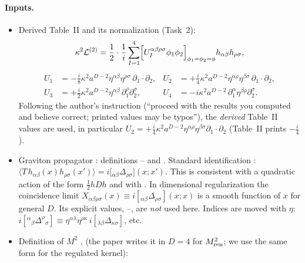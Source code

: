 \paragraph{Inputs.}
\begin{itemize}[leftmargin=2.6em]
\item[(G1)] Derived Table~II and its normalization \tD{} (Task~2):
\begin{equation}\label{eq:t3-G1}
\kappa^2\mathcal L^{(2)}=\frac12\cdot\frac1i\sum_{I=1}^4\Bigl[U_I^{\alpha\beta\rho\sigma}\phi_1\phi_2\Bigr]_{\phi_1=\phi_2=\phi}h_{\alpha\beta}h_{\rho\sigma},
\end{equation}
\begin{equation}\label{eq:t3-U}
\begin{aligned}
U_1&=-\tfrac i8\kappa^2a^{D-2}\eta^{\alpha\beta}\eta^{\rho\sigma}\,\partial_1\!\cdot\partial_2, &
U_2&=+\tfrac i4\kappa^2a^{D-2}\eta^{\alpha\rho}\eta^{\beta\sigma}\,\partial_1\!\cdot\partial_2,\\
U_3&=+\tfrac i2\kappa^2a^{D-2}\eta^{\alpha\beta}\,\partial_1^\rho\partial_2^\sigma, &
U_4&=-i\kappa^2a^{D-2}\,\partial_1^\alpha\eta^{\beta\rho}\partial_2^\sigma .
\end{aligned}
\end{equation}
Following the author's instruction (``proceed with the results you computed and believe
correct; printed values may be typos''), the \emph{derived} Table~II values are used,
in particular \(U_2=+\tfrac i4\kappa^2a^{D-2}\eta^{\alpha\rho}\eta^{\beta\sigma}\partial_1\!\cdot\partial_2\)
(Table~II prints \(-\tfrac i4\)).
\item[(G2)] Graviton propagator \tP: definitions -- and .
Standard identification \tA:
\(\bigl\langle T\,h_{\alpha\beta}(x)h_{\rho\sigma}(x')\bigr\rangle=i\bigl[{}_{\alpha\beta}\Delta_{\rho\sigma}\bigr](x;x')\).
This is consistent with a quadratic action of the form \(\tfrac12hDh\) and with
. In dimensional regularization the coincidence limit
\(X_{\alpha\beta\rho\sigma}(x)\equiv i[{}_{\alpha\beta}\Delta_{\rho\sigma}](x;x)\) is a
smooth function of \(x\) for general \(D\). Its explicit values, --, are
\emph{not} used here. Indices are moved with \(\eta\):
\(i[{}^\alpha{}_\beta\Delta^\rho{}_\sigma]\equiv\eta^{\alpha\lambda}\eta^{\rho\kappa}\,i[{}_{\lambda\beta}\Delta_{\kappa\sigma}]\), etc.
\item[(G3)] Definition of \(M^2\) \tP, \PI{}  (the paper writes it in \(D=4\) for
\(M^2_{\rm ren}\); we use the same form for the regulated kernel):
\begin{equation}\label{eq:t3-G3}

\end{equation}
\end{itemize}
